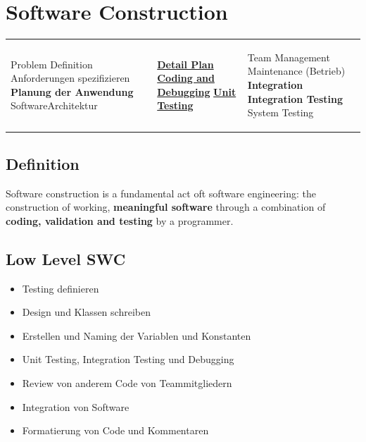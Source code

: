\documentclass[10pt]{article}
\begin{document}
    \section{Software Construction}
    \begin{tabular}{p{50mm} p{50mm} p{50mm}}
        \begin{center}
            Problem Definition \newline
            Anforderungen spezifizieren\newline
            \textbf{Planung der Anwendung}\newline
            SoftwareArchitektur\newline
        \end{center}
        &
        \begin{center}
            \textbf{\uline{Detail Plan}}\newline
            \textbf{\uline{Coding and Debugging}}\newline
            \textbf{\uline{Unit Testing}}\newline
        \end{center}
        &
        \begin{center}
            Team Management\newline
            Maintenance (Betrieb)\newline
            \textbf{Integration}\newline
            \textbf{Integration Testing}\newline
            System Testing\newline
        \end{center}
    \end{tabular}

    \subsection{Definition}
    Software construction is a fundamental act oft software engineering: the construction of working, \textbf{meaningful software} through a combination of \textbf{coding, validation and testing} by a programmer.
    \subsection{Low Level SWC}
    \begin{itemize}
        \item Testing definieren
        \item Design und Klassen schreiben
        \item Erstellen und Naming der Variablen und Konstanten
        \item Unit Testing, Integration Testing und Debugging
        \item Review von anderem Code von Teammitgliedern
        \item Integration von Software
        \item Formatierung von Code und Kommentaren
    \end{itemize}
\end{document}
